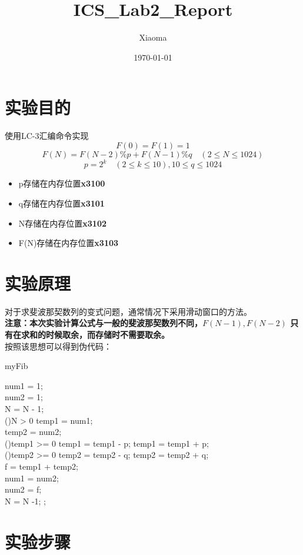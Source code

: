 \documentclass[12pt, a4paper, oneside]{ctexart}
\title{ICS\_Lab2\_Report}
\author{Xiaoma}
\date{\today}
\begin{document}
\maketitle
\section*{实验目的}
使用LC-3汇编命令实现
$$F(0) = F(1) = 1$$
$$F(N) = F(N-2) \% p + F(N-1) \% q \quad (2 \leq N \leq 1024)$$
$$p = 2^{k} \quad (2 \leq k \leq 10),10\leq q \leq 1024$$
\begin{itemize}
    \item p存储在内存位置\textbf{x3100}
    \item q存储在内存位置\textbf{x3101}
    \item N存储在内存位置\textbf{x3102}
    \item F(N)存储在内存位置\textbf{x3103}
\end{itemize}

\section*{实验原理}
对于求斐波那契数列的变式问题，通常情况下采用滑动窗口的方法。\\ \textbf{注意：本次实验计算公式与一般的斐波那契数列不同，$F(N-1),F(N-2)$
只有在求和的时候取余，而存储时不需要取余。}\\
按照该思想可以得到伪代码：

\begin{algorithm*}
    \caption{myFib}
    \label{alg:algorithm}
    \BlankLine
    num1 = 1;\\
    num2 = 1;\\
    N = N - 1;\\
    \While(){N > 0}{
        temp1 = num1;\\
        temp2 = num2;\\
        \While(){temp1 >= 0}{
            temp1 = temp1 - p;
        }
        temp1 = temp1 + p;\\
        \While(){temp2 >= 0}{
            temp2 = temp2 - q;
        }
        temp2 = temp2 + q;\\
        f = temp1 + temp2;\\
        num1 = num2;\\
        num2 = f;\\
        N = N -1;
    }
    ;
\end{algorithm*}

\section*{实验步骤}
\end{document}
